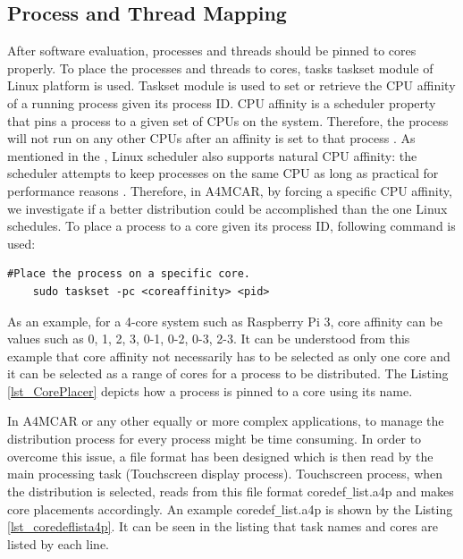 \subsection{Process and Thread Mapping}
After software evaluation, processes and threads should be pinned to cores properly. To place the processes and threads to cores, tasks taskset module of Linux platform is used. Taskset module \cite{taskset} is used to set or retrieve the CPU affinity of a running process given its process ID. CPU affinity is a scheduler property that pins a process to a given set of CPUs on the system. Therefore, the process will not run on any other CPUs after an affinity is set to that process \cite{taskset}. As mentioned in the \cite{taskset}, Linux scheduler also supports natural CPU affinity: the scheduler attempts to keep processes on the same CPU as long as practical for performance reasons \cite{taskset}. Therefore, in A4MCAR, by forcing a specific CPU affinity, we investigate if a better distribution could be accomplished than the one Linux schedules. To place a process to a core given its process ID, following command is used:

\begin{lstlisting}[style=bash]
	#Place the process on a specific core.
	sudo taskset -pc <coreaffinity> <pid>
\end{lstlisting}

As an example, for a 4-core system such as Raspberry Pi 3, core affinity can be values such as 0, 1, 2, 3, 0-1, 0-2, 0-3, 2-3. It can be understood from this example that core affinity not necessarily has to be selected as only one core and it can be selected as a range of cores for a process to be distributed. The Listing \ref{lst_CorePlacer} depicts how a process is pinned to a core using its name.


In A4MCAR or any other equally or more complex applications, to manage the distribution process for every process might be time consuming. In order to overcome this issue, a file format has been designed which is then read by the main processing task (Touchscreen display process). Touchscreen process, when the distribution is selected, reads from this file format coredef\texttt{\_}list.a4p and makes core placements accordingly. An example coredef\texttt{\_}list.a4p is shown by the Listing \ref{lst_coredeflista4p}. It can be seen in the listing that task names and cores are listed by each line.



